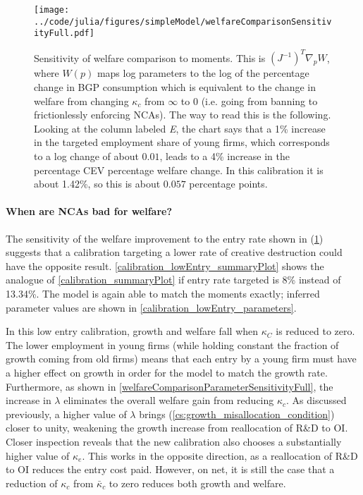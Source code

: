 \documentclass[11pt,english]{article}
\begin{document}
\begin{figure}[]
	\texttt{[image: ../code/julia/figures/simpleModel/welfareComparisonSensitivityFull.pdf]}
	\caption{Sensitivity of welfare comparison to moments. This is $(J^{-1})^T \nabla_p W$, where $W(p)$ maps log parameters to the log of the percentage change in BGP consumption which is equivalent to the change in welfare from changing $\kappa_c$ from $\infty$ to $0$ (i.e. going from banning to frictionlessly enforcing NCAs). The way to read this is the following. Looking at the column labeled \textit{E}, the chart says that a 1\% increase in the targeted employment share of young firms, which corresponds to a log change of about $0.01$, leads to a 4\% increase in the percentage CEV percentage welfare change. In this calibration it is about 1.42\%, so this is about $0.057$ percentage points.}
	\label{welfareComparisonSensitivityFull}
\end{figure}


\paragraph{When are NCAs bad for welfare?}

The sensitivity of the welfare improvement to the entry rate shown in (\ref{welfareComparisonSensitivityFull}) suggests that a calibration targeting a lower rate of creative destruction could have the opposite result. \autoref{calibration_lowEntry_summaryPlot} shows the analogue of \autoref{calibration_summaryPlot} if entry rate targeted is 8\% instead of 13.34\%. The model is again able to match the moments exactly; inferred parameter values are shown in \autoref{calibration_lowEntry_parameters}.

In this low entry calibration, growth and welfare fall when $\kappa_C$ is reduced to zero. The lower employment in young firms (while holding constant the fraction of growth coming from old firms) means that each entry by a young firm must have a higher effect on growth in order for the model to match the growth rate. Furthermore, as shown in \autoref{welfareComparisonParameterSensitivityFull}, the increase in $\lambda$ eliminates the overall welfare gain from reducing $\kappa_c$. As discussed previously, a higher value of $\lambda$ brings (\ref{cs:growth_misallocation_condition}) closer to unity, weakening the growth increase from reallocation of R\&D to OI. Closer inspection reveals that the new calibration also chooses a substantially higher value of $\kappa_e$. This works in the opposite direction, as a reallocation of R\&D to OI reduces the entry cost paid. However, on net, it is still the case that a reduction of $\kappa_c$ from $\bar{\kappa}_c$ to zero reduces both growth and welfare.
\end{document}
